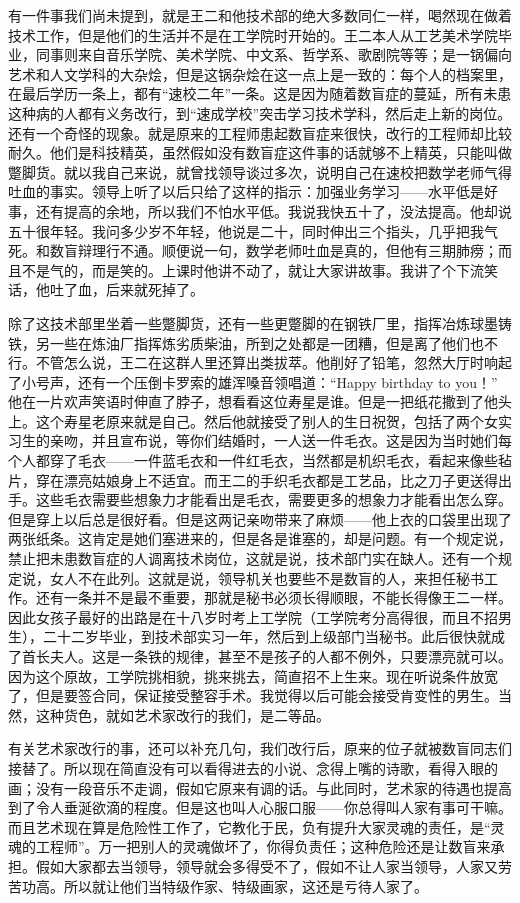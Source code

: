 有一件事我们尚未提到，就是王二和他技术部的绝大多数同仁一样，喝然现在做着技术工作，但是他们的生活并不是在工学院时开始的。王二本人从工艺美术学院毕业，同事则来自音乐学院、美术学院、中文系、哲学系、歌剧院等等；是一锅偏向艺术和人文学科的大杂烩，但是这锅杂烩在这一点上是一致的：每个人的档案里，在最后学历一条上，都有“速校二年”一条。这是因为随着数盲症的蔓延，所有未患这种病的人都有义务改行，到“速成学校”突击学习技术学科，然后走上新的岗位。还有一个奇怪的现象。就是原来的工程师患起数盲症来很快，改行的工程师却比较耐久。他们是科技精英，虽然假如没有数盲症这件事的话就够不上精英，只能叫做蹩脚货。就以我自己来说，就曾找领导谈过多次，说明自己在速校把数学老师气得吐血的事实。领导上听了以后只给了这样的指示：加强业务学习——水平低是好事，还有提高的余地，所以我们不怕水平低。我说我快五十了，没法提高。他却说五十很年轻。我问多少岁不年轻，他说是二十，同时伸出三个指头，几乎把我气死。和数盲辩理行不通。顺便说一句，数学老师吐血是真的，但他有三期肺痨；而且不是气的，而是笑的。上课时他讲不动了，就让大家讲故事。我讲了个下流笑话，他吐了血，后来就死掉了。 

除了这技术部里坐着一些蹩脚货，还有一些更蹩脚的在钢铁厂里，指挥冶炼球墨铸铁，另一些在炼油厂指挥炼劣质柴油，所到之处都是一团糟，但是离了他们也不行。不管怎么说，王二在这群人里还算出类拔萃。他削好了铅笔，忽然大厅时响起了小号声，还有一个压倒卡罗索的雄浑嗓音领唱道：“Happy birthday to you！” 他在一片欢声笑语时伸直了脖子，想看看这位寿星是谁。但是一把纸花撒到了他头上。这个寿星老原来就是自己。然后他就接受了别人的生日祝贺，包括了两个女实习生的亲吻，并且宣布说，等你们结婚时，一人送一件毛衣。这是因为当时她们每个人都穿了毛衣——一件蓝毛衣和一件红毛衣，当然都是机织毛衣，看起来像些毡片，穿在漂亮姑娘身上不适宜。而王二的手织毛衣都是工艺品，比之刀子更送得出手。这些毛衣需要些想象力才能看出是毛衣，需要更多的想象力才能看出怎么穿。但是穿上以后总是很好看。但是这两记亲吻带来了麻烦——他上衣的口袋里出现了两张纸条。这肯定是她们塞进来的，但是各是谁塞的，却是问题。有一个规定说，禁止把未患数盲症的人调离技术岗位，这就是说，技术部门实在缺人。还有一个规定说，女人不在此列。这就是说，领导机关也要些不是数盲的人，来担任秘书工作。还有一条并不是最不重要，那就是秘书必须长得顺眼，不能长得像王二一样。因此女孩子最好的出路是在十八岁时考上工学院（工学院考分高得很，而且不招男生），二十二岁毕业，到技术部实习一年，然后到上级部门当秘书。此后很快就成了首长夫人。这是一条铁的规律，甚至不是孩子的人都不例外，只要漂亮就可以。因为这个原故，工学院挑相貌，挑来挑去，简直招不上生来。现在听说条件放宽了，但是要签合同，保证接受整容手术。我觉得以后可能会接受肯变性的男生。当然，这种货色，就如艺术家改行的我们，是二等品。 

有关艺术家改行的事，还可以补充几句，我们改行后，原来的位子就被数盲同志们接替了。所以现在简直没有可以看得进去的小说、念得上嘴的诗歌，看得入眼的画；没有一段音乐不走调，假如它原来有调的话。与此同时，艺术家的待遇也提高到了令人垂涎欲滴的程度。但是这也叫人心服口服——你总得叫人家有事可干嘛。而且艺术现在算是危险性工作了，它教化于民，负有提升大家灵魂的责任，是“灵魂的工程师”。万一把别人的灵魂做坏了，你得负责任；这种危险还是让数盲来承担。假如大家都去当领导，领导就会多得受不了，假如不让人家当领导，人家又劳苦功高。所以就让他们当特级作家、特级画家，这还是亏待人家了。 




